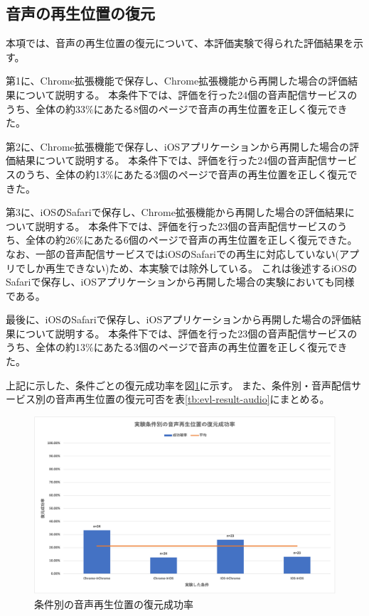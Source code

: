 
\subsection{音声の再生位置の復元}
本項では、音声の再生位置の復元について、本評価実験で得られた評価結果を示す。

第1に、Chrome拡張機能で保存し、Chrome拡張機能から再開した場合の評価結果について説明する。
本条件下では、評価を行った24個の音声配信サービスのうち、全体の約33\%にあたる8個のページで音声の再生位置を正しく復元できた。

第2に、Chrome拡張機能で保存し、iOSアプリケーションから再開した場合の評価結果について説明する。
本条件下では、評価を行った24個の音声配信サービスのうち、全体の約13\%にあたる3個のページで音声の再生位置を正しく復元できた。

第3に、iOSのSafariで保存し、Chrome拡張機能から再開した場合の評価結果について説明する。
本条件下では、評価を行った23個の音声配信サービスのうち、全体の約26\%にあたる6個のページで音声の再生位置を正しく復元できた。
なお、一部の音声配信サービスではiOSのSafariでの再生に対応していない(アプリでしか再生できない)ため、本実験では除外している。
これは後述するiOSのSafariで保存し、iOSアプリケーションから再開した場合の実験においても同様である。

最後に、iOSのSafariで保存し、iOSアプリケーションから再開した場合の評価結果について説明する。
本条件下では、評価を行った23個の音声配信サービスのうち、全体の約13\%にあたる3個のページで音声の再生位置を正しく復元できた。

上記に示した、条件ごとの復元成功率を図\ref{fig:success-rate-audio}に示す。
また、条件別・音声配信サービス別の音声再生位置の復元可否を表\ref{tb:evl-result-audio}にまとめる。

\begin{figure}[htbp]
  \label{fig:success-rate-audio}
  \begin{center}
    \includegraphics[bb=0 0 768.88888889 454.22222222,width=15cm]{img/060_evaluation/result/audio/success-rate-audio.pdf}
  \end{center}
  \caption{条件別の音声再生位置の復元成功率}
\end{figure}

